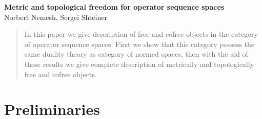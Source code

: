 \documentclass[12pt]{article}
\begin{document}
\begin{center}

\Large \textbf{
    Metric and topological freedom for operator sequence spaces}\\[0.5cm]
\small {Norbert Nemesh, Sergei Shteiner}\\[0.5cm]

\end{center}
\thispagestyle{empty}

\begin{abstract} 
In this paper we give description of free and cofree objects in the  category of
operator sequence spaces. First we show that this category possess the same
duality theory as category of normed spaces, then with the aid of these results
we give complete description of metrically and topologically free and cofree
objects.
\end{abstract}

\section{Preliminaries}
\end{document}
